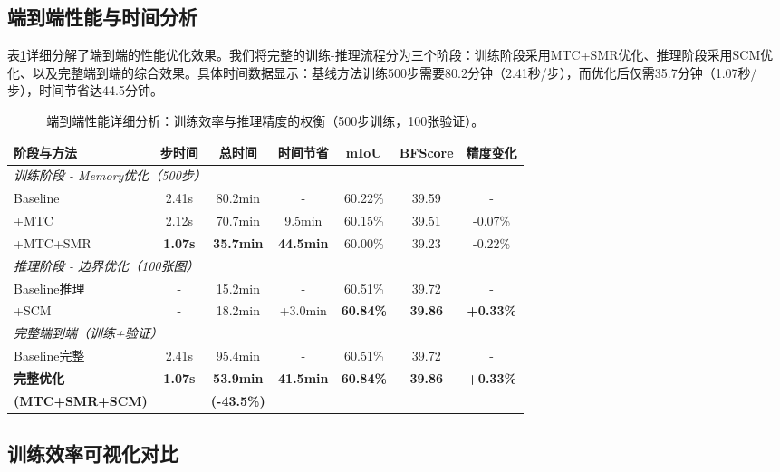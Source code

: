 \subsection{端到端性能与时间分析}

表\ref{tab:end_to_end_detailed}详细分解了端到端的性能优化效果。我们将完整的训练-推理流程分为三个阶段：训练阶段采用MTC+SMR优化、推理阶段采用SCM优化、以及完整端到端的综合效果。具体时间数据显示：基线方法训练500步需要80.2分钟（2.41秒/步），而优化后仅需35.7分钟（1.07秒/步），时间节省达44.5分钟。

\begin{table}[t]
\centering
\caption{端到端性能详细分析：训练效率与推理精度的权衡（500步训练，100张验证）。}
\label{tab:end_to_end_detailed}
\small
\begin{tabular}{lcccccc}
\toprule
\textbf{阶段与方法} & \textbf{步时间} & \textbf{总时间} & \textbf{时间节省} & \textbf{mIoU} & \textbf{BFScore} & \textbf{精度变化} \\
\midrule
\multicolumn{7}{l}{\textit{训练阶段 - Memory优化（500步）}} \\
\quad Baseline & 2.41s & 80.2min & - & 60.22\% & 39.59 & - \\
\quad +MTC & 2.12s & 70.7min & 9.5min & 60.15\% & 39.51 & -0.07\% \\
\quad +MTC+SMR & \textbf{1.07s} & \textbf{35.7min} & \textbf{44.5min} & 60.00\% & 39.23 & -0.22\% \\
\midrule
\multicolumn{7}{l}{\textit{推理阶段 - 边界优化（100张图）}} \\
\quad Baseline推理 & - & 15.2min & - & 60.51\% & 39.72 & - \\
\quad +SCM & - & 18.2min & +3.0min & \textbf{60.84\%} & \textbf{39.86} & \textbf{+0.33\%} \\
\midrule
\multicolumn{7}{l}{\textit{完整端到端（训练+验证）}} \\
\quad Baseline完整 & 2.41s & 95.4min & - & 60.51\% & 39.72 & - \\
\quad \textbf{完整优化} & \textbf{1.07s} & \textbf{53.9min} & \textbf{41.5min} & \textbf{60.84\%} & \textbf{39.86} & \textbf{+0.33\%} \\
\quad \textbf{(MTC+SMR+SCM)} & & \textbf{(-43.5\%)} & & & & \\
\bottomrule
\end{tabular}
\end{table}

\subsection{训练效率可视化对比}

